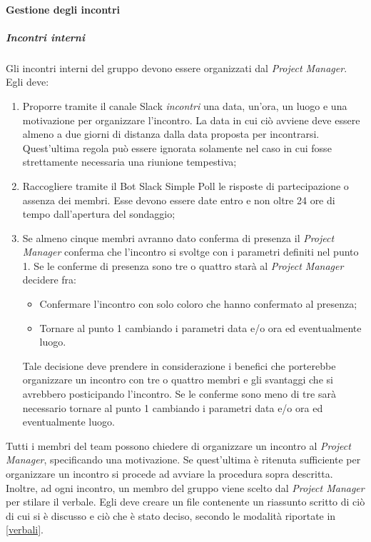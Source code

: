 		\paragraph{Gestione degli incontri}
			\subparagraph{Incontri interni} \Spazio
			 Gli incontri interni del gruppo devono essere organizzati dal \emph{Project Manager}. Egli deve:
			\begin{enumerate}
				\item Proporre tramite il canale Slack \emph{incontri} una data, un'ora, un luogo e una motivazione per organizzare l'incontro. La data in cui ciò avviene deve essere almeno a due giorni di distanza dalla data proposta per incontrarsi. Quest'ultima regola può essere ignorata solamente nel caso in cui fosse strettamente necessaria una riunione tempestiva;
				
				\item Raccogliere tramite il Bot Slack Simple Poll le risposte di partecipazione o assenza dei membri. Esse devono essere date entro e non oltre 24 ore di tempo dall'apertura del sondaggio;
				
				\item Se almeno cinque membri avranno dato conferma di presenza il \emph{Project Manager} conferma che l'incontro si svoltge con i parametri definiti nel punto 1. 
				Se le conferme di presenza sono tre o quattro starà al \emph{Project Manager} decidere fra: 
				\begin{itemize}
					\item Confermare l'incontro con solo coloro che hanno confermato al presenza;
					\item Tornare al punto 1 cambiando i parametri data e/o ora ed eventualmente luogo.
				\end{itemize}
				Tale decisione deve prendere in considerazione i benefici che porterebbe organizzare un incontro con tre o quattro membri e gli svantaggi che si avrebbero posticipando l'incontro.
				Se le conferme sono meno di tre sarà necessario tornare al punto 1 cambiando i parametri data e/o ora ed eventualmente luogo.
			\end{enumerate}
			Tutti i membri del team possono chiedere di organizzare un incontro al \emph{Project Manager}, specificando una motivazione. Se quest'ultima è ritenuta sufficiente per organizzare un incontro si procede ad avviare la procedura sopra descritta. 
			\\Inoltre, ad ogni incontro, un membro del gruppo viene scelto dal \emph{Project Manager} per stilare il verbale. Egli deve creare un file contenente un riassunto scritto di ciò di cui si è discusso e ciò che è stato deciso, secondo le modalità riportate in \ref{verbali}.
			
